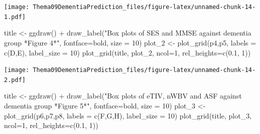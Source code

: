\documentclass[
]{article}
\newenvironment{Shaded}{\begin{snugshade}}{\end{snugshade}}
\newcommand{\AttributeTok}[1]{\textcolor[rgb]{0.77,0.63,0.00}{#1}}
\newcommand{\DecValTok}[1]{\textcolor[rgb]{0.00,0.00,0.81}{#1}}
\newcommand{\FloatTok}[1]{\textcolor[rgb]{0.00,0.00,0.81}{#1}}
\newcommand{\FunctionTok}[1]{\textcolor[rgb]{0.00,0.00,0.00}{#1}}
\newcommand{\NormalTok}[1]{#1}
\newcommand{\OtherTok}[1]{\textcolor[rgb]{0.56,0.35,0.01}{#1}}
\newcommand{\SpecialCharTok}[1]{\textcolor[rgb]{0.00,0.00,0.00}{#1}}
\newcommand{\StringTok}[1]{\textcolor[rgb]{0.31,0.60,0.02}{#1}}
\begin{document}
\texttt{[image: Thema09DementiaPrediction\_files/figure-latex/unnamed-chunk-14-1.pdf]}

\begin{Shaded}
\begin{Highlighting}[]
\NormalTok{title }\OtherTok{\textless{}{-}} \FunctionTok{ggdraw}\NormalTok{() }\SpecialCharTok{+} \FunctionTok{draw\_label}\NormalTok{(}\StringTok{"Box plots of SES and MMSE against dementia group *Figure 4*"}\NormalTok{, }\AttributeTok{fontface=}\StringTok{\textquotesingle{}bold\textquotesingle{}}\NormalTok{, }\AttributeTok{size =} \DecValTok{10}\NormalTok{)}
\NormalTok{plot\_2 }\OtherTok{\textless{}{-}} \FunctionTok{plot\_grid}\NormalTok{(p4,p5, }\AttributeTok{labels =} \FunctionTok{c}\NormalTok{(}\StringTok{\textquotesingle{}D\textquotesingle{}}\NormalTok{,}\StringTok{\textquotesingle{}E\textquotesingle{}}\NormalTok{), }\AttributeTok{label\_size =} \DecValTok{10}\NormalTok{)}
\FunctionTok{plot\_grid}\NormalTok{(title, plot\_2, }\AttributeTok{ncol=}\DecValTok{1}\NormalTok{, }\AttributeTok{rel\_heights=}\FunctionTok{c}\NormalTok{(}\FloatTok{0.1}\NormalTok{, }\DecValTok{1}\NormalTok{))}
\end{Highlighting}
\end{Shaded}

\texttt{[image: Thema09DementiaPrediction\_files/figure-latex/unnamed-chunk-14-2.pdf]}

\begin{Shaded}
\begin{Highlighting}[]
\NormalTok{title }\OtherTok{\textless{}{-}} \FunctionTok{ggdraw}\NormalTok{() }\SpecialCharTok{+} \FunctionTok{draw\_label}\NormalTok{(}\StringTok{"Box plots of eTIV, nWBV and ASF against dementia group *Figure 5*"}\NormalTok{, }\AttributeTok{fontface=}\StringTok{\textquotesingle{}bold\textquotesingle{}}\NormalTok{, }\AttributeTok{size =} \DecValTok{10}\NormalTok{)}
\NormalTok{plot\_3 }\OtherTok{\textless{}{-}} \FunctionTok{plot\_grid}\NormalTok{(p6,p7,p8, }\AttributeTok{labels =} \FunctionTok{c}\NormalTok{(}\StringTok{\textquotesingle{}F\textquotesingle{}}\NormalTok{,}\StringTok{\textquotesingle{}G\textquotesingle{}}\NormalTok{,}\StringTok{\textquotesingle{}H\textquotesingle{}}\NormalTok{), }\AttributeTok{label\_size =} \DecValTok{10}\NormalTok{)}
\FunctionTok{plot\_grid}\NormalTok{(title, plot\_3, }\AttributeTok{ncol=}\DecValTok{1}\NormalTok{, }\AttributeTok{rel\_heights=}\FunctionTok{c}\NormalTok{(}\FloatTok{0.1}\NormalTok{, }\DecValTok{1}\NormalTok{))}
\end{Highlighting}
\end{Shaded}
\end{document}
